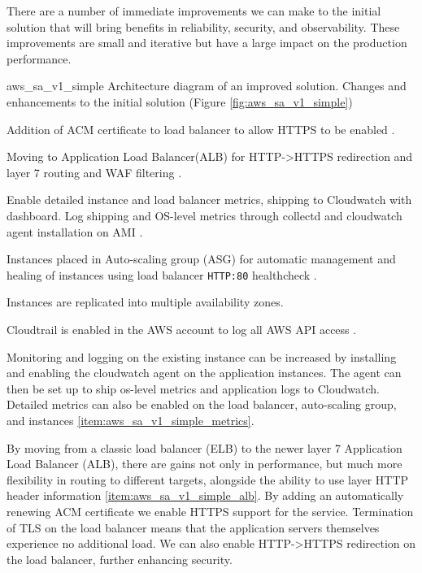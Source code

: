 

There are a number of immediate improvements we can make to the initial solution that will bring benefits in reliability, security, and observability. These improvements are small and iterative but have a large impact on the production performance. 

\architecture
{aws_sa_v1_simple}
{Architecture diagram of an improved solution.}
\changes
{Changes and enhancements to the initial solution (Figure \ref{fig:aws_sa_v1_simple})}
{
	\item \label{item:aws_sa_v1_simple_acm} Addition of ACM certificate to load balancer to allow HTTPS to be enabled \cite{acm-apiref}.
	\item \label{item:aws_sa_v1_simple_alb} Moving to Application Load Balancer(ALB) for HTTP->HTTPS redirection and layer 7 routing and WAF filtering \cite{elb-api}.
	\item \label{item:aws_sa_v1_simple_metrics} Enable detailed instance and load balancer metrics, shipping to Cloudwatch with dashboard. Log shipping and OS-level metrics through collectd and cloudwatch agent installation on AMI \cite{cwl-api}.
	\item \label{item:aws_sa_v1_simple_asg} Instances placed in Auto-scaling group (ASG) for automatic management and healing of instances using load balancer \texttt{HTTP:80} healthcheck \cite{as-api}. 
	\item \label{item:aws_sa_v1_simple_azs} Instances are replicated into multiple availability zones.
	\item \label{item:aws_sa_v1_simple_trail} Cloudtrail is enabled in the AWS account to log all AWS API access \cite{awscloudtrail-api}. 
}

\FloatBarrier


Monitoring and logging on the existing instance can be increased by installing and enabling the cloudwatch agent on the application instances. The agent can then be set up to ship os-level metrics and application logs to Cloudwatch. Detailed metrics can also be enabled on the load balancer, auto-scaling group, and instances \ref{item:aws_sa_v1_simple_metrics}. 



By moving from a classic load balancer (ELB) to the newer layer 7 Application Load Balancer (ALB), there are gains not only in performance, but much more flexibility in routing to different targets, alongside the ability to use layer HTTP header information \ref{item:aws_sa_v1_simple_alb}. By adding an automatically renewing ACM certificate we enable HTTPS support for the service. Termination of TLS on the load balancer means that the application servers themselves experience no additional load. We can also enable HTTP->HTTPS redirection on the load balancer, further enhancing security. 

